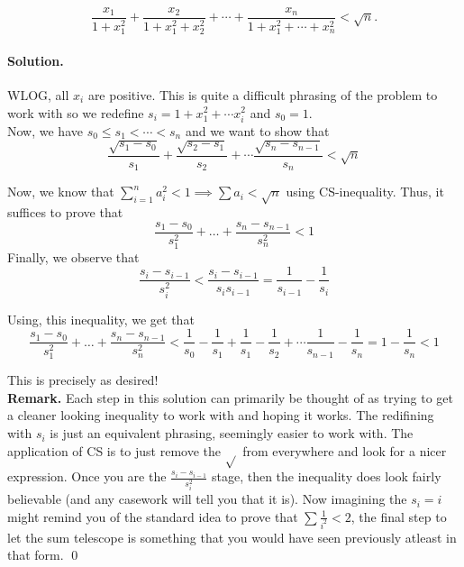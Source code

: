 \documentclass[12pt]{article}
\newenvironment{solution}
{\paragraph{Solution.}}
{\qed\eject}
\begin{document}
\[
\frac{x_1}{1+x_1^2} + \frac{x_2}{1+x_1^2 + x_2^2} + \cdots +
\frac{x_n}{1 + x_1^2 + \cdots + x_n^2} < \sqrt{n}.
\]

\begin{solution}
    WLOG, all $x_i$ are positive. This is quite a difficult phrasing of the problem to work with so we redefine $s_i=1+x_1^2+\cdots x_i^2$ and $s_0=1$.\\
    
    Now, we have $s_0\le s_1<\cdots <s_n$ and we want to show that \[\frac{\sqrt{s_1-s_0}}{s_1}+\frac{\sqrt{s_2-s_1}}{s_2}+\cdots \frac{\sqrt{s_n-s_{n-1}}}{s_n}<\sqrt{n}\]

    Now, we know that $\sum\limits_{i=1}^n a_i^2<1\implies \sum a_i<\sqrt{n}$ using CS-inequality. Thus, it suffices to prove that \[\frac{s_1-s_0}{s_1^2}+\ldots +\frac{s_n-s_{n-1}}{s_n^2}<1\]
    Finally, we observe that \[\frac{s_i-s_{i-1}}{s_i^2}<\frac{s_i-s_{i-1}}{s_is_{i-1}}=\frac{1}{s_{i-1}}-\frac{1}{s_i}\]

    Using, this inequality, we get that \[\frac{s_1-s_0}{s_1^2}+\ldots +\frac{s_n-s_{n-1}}{s_n^2}<\frac{1}{s_0}-\frac{1}{s_1}+\frac{1}{s_1}-\frac{1}{s_2}+\cdots \frac{1}{s_{n-1}}-\frac{1}{s_n}=1-\frac{1}{s_n} < 1\]

    This is precisely as desired! \\

    \textbf{Remark.} Each step in this solution can primarily be thought of as trying to get a cleaner looking inequality to work with and hoping it works. The redifining with $s_i$ is just an equivalent phrasing, seemingly easier to work with. The application of CS is to just remove the $\sqrt{}$ from everywhere and look for a nicer expression. Once you are the $\frac{s_i-s_{i-1}}{s_i^2}$ stage, then the inequality does look fairly believable (and any casework will tell you that it is). Now imagining the $s_i=i$ might remind you of the standard idea to prove that $\sum \frac{1}{i^2}<2$, the final step to let the sum telescope is something that you would have seen previously atleast in that form.
\end{solution}
\end{document}
